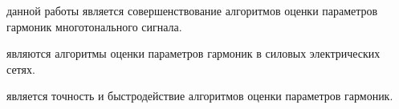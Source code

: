 %
%
%

{\aim} данной работы является совершенствование алгоритмов оценки параметров гармоник многотонального сигнала.

{\researchObject} являются алгоритмы оценки параметров гармоник в силовых электрических сетях.

{\researchSubject} является точность и быстродействие алгоритмов оценки параметров гармоник.

